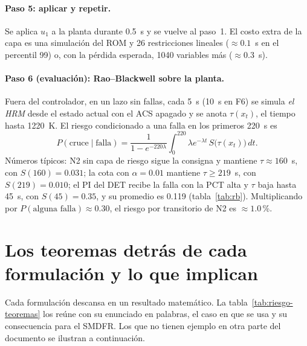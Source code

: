 \paragraph{Paso 5: aplicar y repetir.} Se aplica $u_1$ a la planta durante 0.5~s y se vuelve al
paso~1. El costo extra de la capa es una simulación del ROM y 26 restricciones lineales
($\approx0.1$~s en el percentil 99) o, con la pérdida esperada, 1040 variables más
($\approx0.3$~s).

\paragraph{Paso 6 (evaluación): Rao--Blackwell sobre la planta.} Fuera del controlador, en un lazo
sin fallas, cada 5~s (10~s en F6) se simula \emph{el HRM} desde el estado actual con el ACS
apagado y se anota $\tau(x_t)$, el tiempo hasta 1220~K. El riesgo condicionado a una falla en los
primeros 220~s es
\[
P(\text{cruce}\mid\text{falla})=\frac{1}{1-e^{-220\lambda}}\int_0^{220}\lambda e^{-\lambda t}\,S\big(\tau(x_t)\big)\,dt .
\]
Números típicos: N2 sin capa de riesgo sigue la consigna y mantiene $\tau\approx160$~s, con
$S(160)=0.031$; la cota con $\alpha=0.01$ mantiene $\tau\ge219$~s, con $S(219)=0.010$; el PI del DET
recibe la falla con la PCT alta y $\tau$ baja hasta 45~s, con $S(45)=0.35$, y su promedio es 0.119
(tabla~\ref{tab:rb}). Multiplicando por $P(\text{alguna falla})\approx0.30$, el riesgo por
transitorio de N2 es $\approx1.0$\,\%.


\section{Los teoremas detrás de cada formulación y lo que implican}\label{sec:riesgo-teoremas}
Cada formulación descansa en un resultado matemático. La tabla~\ref{tab:riesgo-teoremas} los
reúne con su enunciado en palabras, el caso en que se usa y su consecuencia para el SMDFR. Los
que no tienen ejemplo en otra parte del documento se ilustran a continuación.

